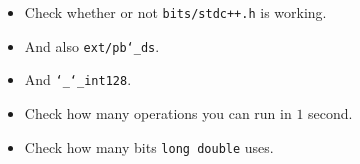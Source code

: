 \begin{itemize}
	\item Check whether or not \texttt{bits/stdc++.h} is working.
	\item And also \texttt{ext/pb\char`_ds}.
	\item And \texttt{\char`_\char`_int128}.
	\item Check how many operations you can run in $1$ second.
	\item Check how many bits \texttt{long double} uses.
\end{itemize}